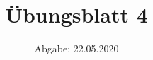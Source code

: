 

\subject{Computational Physics}
\title{Übungsblatt 4}
\date{%
  Abgabe: 22.05.2020
}



\maketitle
\thispagestyle{empty}
\newpage








